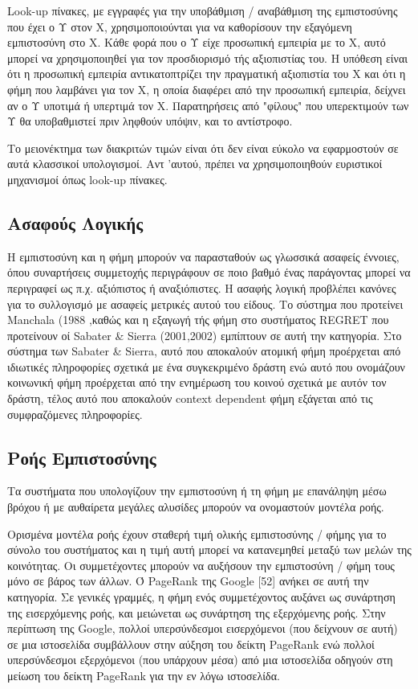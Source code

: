 Look-up πίνακες, με εγγραφές για την υποβάθμιση / αναβάθμιση της εμπιστοσύνης που έχει ο Υ στον Χ, χρησιμοποιούνται για να καθορίσουν την εξαγόμενη εμπιστοσύνη στο Χ. Κάθε φορά που ο Υ είχε προσωπική εμπειρία με το Χ, αυτό μπορεί να χρησιμοποιηθεί για τον προσδιορισμό τής αξιοπιστίας του. Η υπόθεση είναι ότι η προσωπική εμπειρία αντικατοπτρίζει την πραγματική αξιοπιστία του Χ και ότι η φήμη που λαμβάνει για τον Χ, η οποία διαφέρει από την προσωπική εμπειρία, δείχνει αν ο Υ υποτιμά ή υπερτιμά τον Χ. Παρατηρήσεις από "φίλους" που υπερεκτιμούν των Υ θα υποβαθμιστεί πριν ληφθούν υπόψιν, και το αντίστροφο.

Το μειονέκτημα των διακριτών τιμών είναι ότι δεν είναι εύκολο να εφαρμοστούν σε αυτά κλασσικοί υπολογισμοί. Αντ 'αυτού, πρέπει να χρησιμοποιηθούν ευριστικοί μηχανισμοί όπως look-up πίνακες.

\subsection{Ασαφούς Λογικής}

Η εμπιστοσύνη και η φήμη μπορούν να παρασταθούν ως γλωσσικά ασαφείς έννοιες, όπου συναρτήσεις συμμετοχής περιγράφουν σε ποιο βαθμό ένας παράγοντας μπορεί να περιγραφεί ως π.χ. αξιόπιστος ή αναξιόπιστες. Η ασαφής λογική προβλέπει κανόνες για το συλλογισμό με ασαφείς μετρικές αυτού του είδους. Το σύστημα που προτείνει Manchala (1988%
,καθώς και η εξαγωγή τής φήμη στο συστήματος REGRET που προτείνουν οί Sabater \& Sierra (2001,2002) %
 εμπίπτουν σε αυτή την κατηγορία. Στο σύστημα των Sabater \& Sierra, αυτό που αποκαλούν ατομική φήμη προέρχεται από ιδιωτικές πληροφορίες σχετικά με ένα συγκεκριμένο δράστη ενώ αυτό που ονομάζουν κοινωνική φήμη προέρχεται από την ενημέρωση του κοινού σχετικά με αυτόν τον δράστη, τέλος αυτό που αποκαλούν context dependent φήμη εξάγεται από τις συμφραζόμενες πληροφορίες.

\subsection{Ροής Εμπιστοσύνης}

Τα συστήματα που υπολογίζουν την εμπιστοσύνη ή τη φήμη με επανάληψη μέσω βρόχου ή με αυθαίρετα μεγάλες αλυσίδες μπορούν να ονομαστούν μοντέλα ροής.

Ορισμένα μοντέλα ροής έχουν σταθερή τιμή ολικής εμπιστοσύνης / φήμης για το σύνολο του συστήματος και η τιμή αυτή μπορεί να κατανεμηθεί μεταξύ των μελών της κοινότητας. Οι συμμετέχοντες μπορούν να αυξήσουν την εμπιστοσύνη / φήμη τους μόνο σε βάρος των άλλων. Ό PageRank της Google [52] ανήκει σε αυτή την κατηγορία. Σε γενικές γραμμές, η φήμη ενός συμμετέχοντος αυξάνει ως συνάρτηση της εισερχόμενης ροής, και μειώνεται ως συνάρτηση της εξερχόμενης ροής. Στην περίπτωση της Google, πολλοί υπερσύνδεσμοι εισερχόμενοι (που δείχνουν σε αυτή) σε μια ιστοσελίδα συμβάλλουν στην αύξηση του δείκτη PageRank ενώ πολλοί υπερσύνδεσμοι εξερχόμενοι (που υπάρχουν μέσα) από μια ιστοσελίδα οδηγούν στη μείωση του δείκτη PageRank για την εν λόγω ιστοσελίδα.

